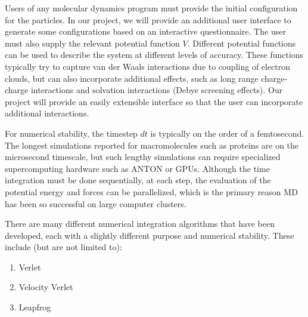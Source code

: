 \documentclass[10pt]{article}
\begin{document}
Users of any molecular dynamics program must provide the initial configuration for the particles.  In our project, we will provide an additional user interface to generate some configurations based on an interactive questionnaire. The user must also supply the relevant potential function $V$. Different potential functions can be used to describe the system at different levels of accuracy. These functions typically try to capture van der Waals interactions due to coupling of electron clouds, but can also incorporate additional effects, such as long range charge-charge interactions and solvation interactions (Debye screening effects). Our project will provide an easily extensible interface so that the user can incorporate additional interactions.

For numerical stability, the timestep $dt$ is typically on the order of a femtosecond. The longest simulations reported for macromolecules such as proteins are on the microsecond timescale, but such lengthy simulations can require specialized supercomputing hardware such as ANTON or GPUs. Although the time integration must be done sequentially, at each step, the evaluation of the potential energy and forces can be parallelized, which is the primary reason MD has been so successful on large computer clusters.


There are many different numerical integration algorithms that have been developed, each with a slightly different purpose and numerical stability.  These include (but are not limited to):

\begin{enumerate}
    \item Verlet
    \item Velocity Verlet
    \item Leapfrog
\end{enumerate}
\end{document}
